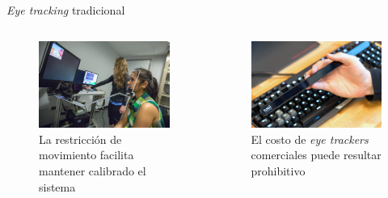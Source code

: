 \documentclass[aspectratio=169]{beamer}
\begin{document}
\begin{frame}{\textit{Eye tracking} tradicional}

  \begin{columns}
    \begin{column}{0.5\textwidth}
      \begin{figure}
        \centering
        \includegraphics[width=\linewidth]{img/eye-link-chinrest.jpg}
        \caption{La restricción de movimiento facilita mantener calibrado el
        sistema}
      \end{figure}
    \end{column}

    \begin{column}{0.5\textwidth}
      \begin{figure}
        \centering
        \includegraphics[width=0.8\linewidth]{img/tobii-eyetracker.jpg}
        \caption{El costo de \textit{eye trackers} comerciales puede resultar
        prohibitivo}
      \end{figure}
    \end{column}
  \end{columns}
\end{frame}
\end{document}
